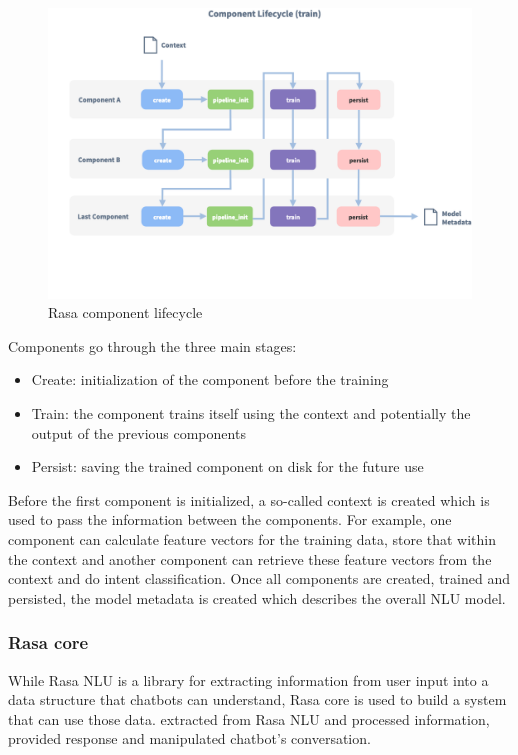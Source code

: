 \begin{figure}[h]
    \label{fig:rasacomponentlifecycle}
    \centering
    \includegraphics[width=1\textwidth]{Picture/Rasa-Component-Lifecycle--Train-.png}
    \caption{Rasa component lifecycle}
\end{figure}

Components go through the three main stages:
\begin{itemize}
\item Create: initialization of the component before the training
\item Train: the component trains itself using the context and potentially the output of the previous components
\item Persist: saving the trained component on disk for the future use
\end{itemize}
Before the first component is initialized, a so-called context is created which is used to pass the information between the components. For example, one component can calculate feature vectors for the training data, store that within the context and another component can retrieve these feature vectors from the context and do intent classification. Once all components are created, trained and persisted, the model metadata is created which describes the overall NLU model.

\subsubsection{Rasa core}

While Rasa NLU is a library for extracting information from user input into a data structure that chatbots can understand, Rasa core is used to build a system that can use those data. extracted from Rasa NLU and processed information, provided response and manipulated chatbot's conversation.

